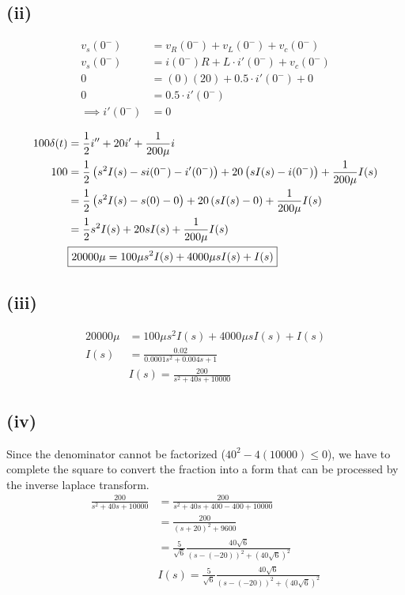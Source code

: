 \subsection{(ii)}

\begin{tcolorbox}[colback=softbg, colframe=accentteal, title={}, arc=3pt, outer arc=3pt, boxrule=0.8pt, leftrule=4pt, fonttitle=\bfseries\sffamily]
\begin{align*}
    v_s(0^-) &= v_R(0^-) + v_L(0^-) + v_c(0^-) \\
    v_s(0^-) &= i(0^-)R + L \cdot i'(0^-) + v_c(0^-) \\
    0 &= (0)(20) + 0.5 \cdot i'(0^-) + 0 \\
    0 &= 0.5 \cdot i'(0^-) \\
    \implies i'(0^-) &= 0
\end{align*}
\end{tcolorbox}
\begin{align*}
    100\delta(t) &= \frac{1}{2}i'' + 20i' + \frac{1}{200\mu}i\\
    100 &= \frac{1}{2}\left(s^2I(s)-si(0^-)-i'(0^-)\right) + 20\left(sI(s)-i(0^-)\right) + \frac{1}{200\mu}I(s) \\
    &= \frac{1}{2}\left(s^2I(s) - s(0) - 0\right) + 20\left(sI(s) - 0\right) + \frac{1}{200\mu}I(s) \\
    &= \frac{1}{2}s^2I(s) + 20sI(s) + \frac{1}{200\mu}I(s) \\
    &\boxed{20000\mu = 100\mu s^2 I(s) + 4000\mu s I(s) + I(s)}
\end{align*}

\subsection{(iii)}
\begin{align*}
    20000\mu &= 100\mu s^2 I(s) + 4000\mu s I(s) + I(s)\\
    I(s) &= \frac{0.02}{0.0001 s^2 + 0.004s + 1}\\
    & \boxed{I(s) = \frac{200}{s^2 + 40s + 10000}}
\end{align*}

\subsection{(iv)}
Since the denominator cannot be factorized ($40^2 - 4(10000) \leq 0$), we have to complete the square to convert the fraction into a form that can be processed by the inverse laplace transform.
\begin{align*}
    \frac{200}{s^2 + 40s + 10000} &= \frac{200}{s^2 + 40s + 400 - 400 + 10000}\\
    &= \frac{200}{(s+20)^2 + 9600}\\
    &= \frac{5}{\sqrt{6}} \frac{40\sqrt{6}}{(s-(-20))^2 + (40\sqrt{6})^2}\\
    &\boxed{I(s)=\frac{5}{\sqrt{6}} \frac{40\sqrt{6}}{(s-(-20))^2 + (40\sqrt{6})^2}}
\end{align*}

